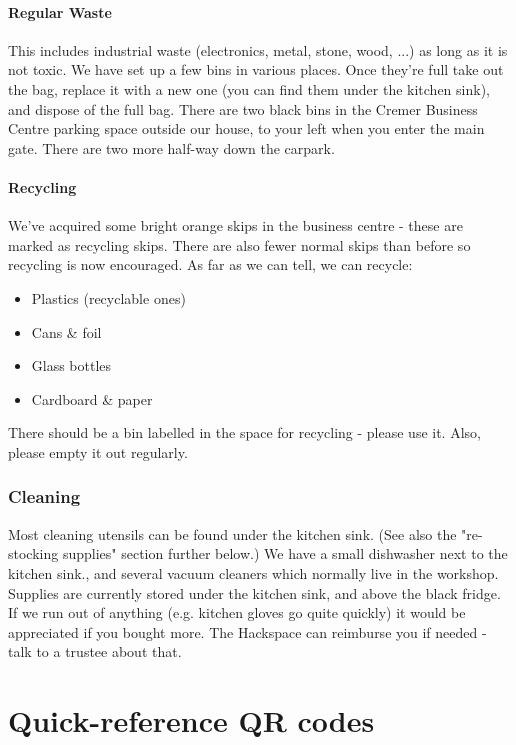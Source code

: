 \documentclass[12pt,a4paper]{book}
\begin{document}
\subsubsection{Regular Waste}

This includes industrial waste (electronics, metal, stone, wood, ...) as long as it is not toxic. We have set up a few bins in various places. Once they're full take out the bag, replace it with a new one (you can find them under the kitchen sink), and dispose of the full bag. There are two black bins in the Cremer Business Centre parking space outside our house, to your left when you enter the main gate. There are two more half-way down the carpark.

\subsubsection{Recycling}

We've acquired some bright orange skips in the business centre - these are marked as recycling skips. There are also fewer normal skips than before so recycling is now encouraged. As far as we can tell, we can recycle:

\begin{itemize}
	\item Plastics (recyclable ones)
	\item Cans \& foil
	\item Glass bottles
	\item Cardboard \& paper
\end{itemize}

There should be a bin labelled in the space for recycling - please use it. Also, please empty it out regularly.

\subsection{Cleaning}

Most cleaning utensils can be found under the kitchen sink. (See also the "re-stocking supplies" section further below.) We have a small dishwasher next to the kitchen sink., and several vacuum cleaners which normally live in the workshop. Supplies are currently stored under the kitchen sink, and above the black fridge. If we run out of anything (e.g. kitchen gloves go quite quickly) it would be appreciated if you bought more. The Hackspace can reimburse you if needed - talk to a trustee about that.

\chapter{Quick-reference QR codes}
\end{document}
